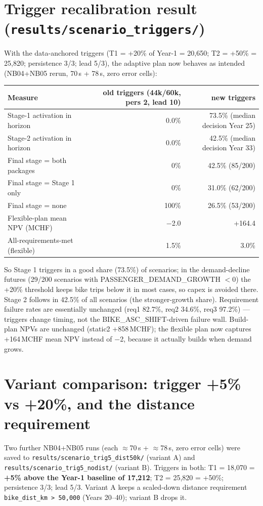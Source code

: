 \documentclass[10pt,a4paper]{article}
\begin{document}
\section{Trigger recalibration result (\texttt{results/scenario\_triggers/})}
With the data-anchored triggers (T1 = +20\% of Year-1 = 20{,}650; T2 = +50\% = 25{,}820;
persistence 3/3; lead 5/3), the adaptive plan now behaves as intended (NB04+NB05 rerun,
70\,s + 78\,s, zero error cells):

\begin{center}\small\begin{tabular}{@{}lrr@{}}
\toprule
Measure & old triggers (44k/60k, pers 2, lead 10) & new triggers \\
\midrule
Stage-1 activation in horizon & 0.0\% & 73.5\% (median decision Year 25) \\
Stage-2 activation in horizon & 0.0\% & 42.5\% (median decision Year 33) \\
Final stage = both packages & 0\% & 42.5\% (85/200) \\
Final stage = Stage 1 only & 0\% & 31.0\% (62/200) \\
Final stage = none & 100\% & 26.5\% (53/200) \\
Flexible-plan mean NPV (MCHF) & $-$2.0 & +164.4 \\
All-requirements-met (flexible) & 1.5\% & 3.0\% \\
\bottomrule
\end{tabular}\end{center}

So Stage 1 triggers in a good share (73.5\%) of scenarios; in the demand-decline futures
(29/200 scenarios with PASSENGER\_DEMAND\_GROWTH ${<}0$) the +20\% threshold keeps bike
trips below it in most cases, so capex is avoided there. Stage 2 follows in 42.5\% of all
scenarios (the stronger-growth share). Requirement failure rates are essentially
unchanged (req1 82.7\%, req2 34.6\%, req3 97.2\%) --- triggers change timing, not the
BIKE\_ASC\_SHIFT-driven failure wall. Build-plan NPVs are unchanged (static2 +858\,MCHF);
the flexible plan now captures +164\,MCHF mean NPV instead of $-$2, because it actually
builds when demand grows.

\section{Variant comparison: trigger +5\% vs +20\%, and the distance requirement}
Two further NB04+NB05 runs (each $\approx$70\,s + $\approx$78\,s, zero error cells) were saved to
\texttt{results/scenario\_trig5\_dist50k/} (variant A) and \texttt{results/scenario\_trig5\_nodist/}
(variant B). Triggers in both: T1 = 18{,}070 = \textbf{+5\% above the Year-1 baseline of
17{,}212}; T2 = 25{,}820 = +50\%; persistence 3/3; lead 5/3. Variant A keeps a scaled-down
distance requirement \texttt{bike\_dist\_km > 50{,}000} (Years 20--40); variant B drops it.
\end{document}
